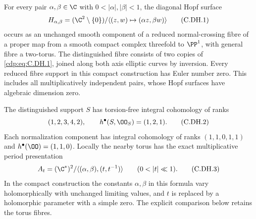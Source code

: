 
\begin{proposition}\label{cdp:st:C.2.UN.41}
For every pair $\alpha,\beta\in\C$ with
$0<|\alpha|,|\beta|<1$, the diagonal Hopf surface
\[
 H_{\alpha,\beta}=(\C^2\setminus\{0\})/
       \langle(z,w)\mapsto(\alpha z,\beta w)\rangle
                                                               \tag{C.DH.1}\label{cdp:eq:C.DH.1}
\]
occurs as an unchanged smooth component of a
reduced normal-crossing fibre of a proper map
from a smooth compact complex threefold to
$\PP^1$, with general fibre a two-torus.
The distinguished fibre consists of two copies
of \eqref{cdp:eq:C.DH.1}, joined along both axis elliptic
curves by inversion. Every reduced fibre
support in this compact construction has
Euler number zero. This includes all
multiplicatively independent pairs, whose
Hopf surfaces have algebraic dimension zero.

The distinguished support $S$ has torsion-free
integral cohomology of ranks
\[
                  (1,2,3,4,2),\qquad
                  h^\bullet(S,\OO_S)=(1,2,1).        \tag{C.DH.2}\label{cdp:eq:C.DH.2}
\]
Each normalization component has integral
cohomology of ranks $(1,1,0,1,1)$ and
$h^\bullet(\OO)=(1,1,0)$.
Locally the nearby torus has the exact
multiplicative period presentation
\[
 A_t=(\C^*)^2/
        \langle(\alpha,\beta),(t,t^{-1})\rangle
                    \qquad(0<|t|\ll1).             \tag{C.DH.3}\label{cdp:eq:C.DH.3}
\]
In the compact construction the constants
$\alpha,\beta$ in this formula vary
holomorphically with unchanged limiting
values, and $t$ is replaced by a holomorphic
parameter with a simple zero. The explicit
comparison below retains the torus fibres.
\end{proposition}

